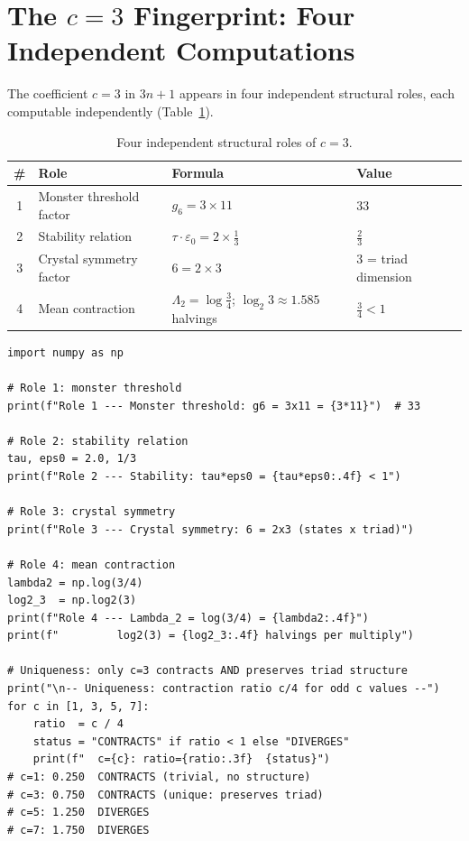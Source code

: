 \documentclass[11pt, a4paper]{article}
\theoremstyle{definition}
\newcommand{\Lam}{\Lambda}
\newcommand{\gmon}{g_6}
\newcommand{\EPS}{\varepsilon_0}
\begin{document}
\section{The $c = 3$ Fingerprint: Four Independent Computations}
\label{sec:fingerprint}

The coefficient $c = 3$ in $3n+1$ appears in four independent structural roles,
each computable independently (Table~\ref{tab:fingerprint}).

\begin{table}[H]
\centering
\small
\caption{Four independent structural roles of $c=3$.}
\label{tab:fingerprint}
\begin{tabular}{clll}
\toprule
\# & Role & Formula & Value \\
\midrule
1 & Monster threshold factor & $\gmon = 3 \times 11$ & $33$ \\[2pt]
2 & Stability relation & $\tau \cdot \EPS = 2 \times \tfrac{1}{3}$ & $\tfrac{2}{3}$ \\[2pt]
3 & Crystal symmetry factor & $6 = 2 \times 3$ & 3 = triad dimension \\[2pt]
4 & Mean contraction & $\Lam_2 = \log\tfrac{3}{4}$;\; $\log_2 3 \approx 1.585$ halvings & $\tfrac{3}{4} < 1$ \\
\bottomrule
\end{tabular}
\end{table}

\begin{lstlisting}[language=Python3, caption={$c=3$ fingerprint --- all four roles and uniqueness check}, label={lst:fingerprint}]
import numpy as np

# Role 1: monster threshold
print(f"Role 1 --- Monster threshold: g6 = 3x11 = {3*11}")  # 33

# Role 2: stability relation
tau, eps0 = 2.0, 1/3
print(f"Role 2 --- Stability: tau*eps0 = {tau*eps0:.4f} < 1")

# Role 3: crystal symmetry
print(f"Role 3 --- Crystal symmetry: 6 = 2x3 (states x triad)")

# Role 4: mean contraction
lambda2 = np.log(3/4)
log2_3  = np.log2(3)
print(f"Role 4 --- Lambda_2 = log(3/4) = {lambda2:.4f}")
print(f"         log2(3) = {log2_3:.4f} halvings per multiply")

# Uniqueness: only c=3 contracts AND preserves triad structure
print("\n-- Uniqueness: contraction ratio c/4 for odd c values --")
for c in [1, 3, 5, 7]:
    ratio  = c / 4
    status = "CONTRACTS" if ratio < 1 else "DIVERGES"
    print(f"  c={c}: ratio={ratio:.3f}  {status}")
# c=1: 0.250  CONTRACTS (trivial, no structure)
# c=3: 0.750  CONTRACTS (unique: preserves triad)
# c=5: 1.250  DIVERGES
# c=7: 1.750  DIVERGES
\end{lstlisting}
\end{document}
